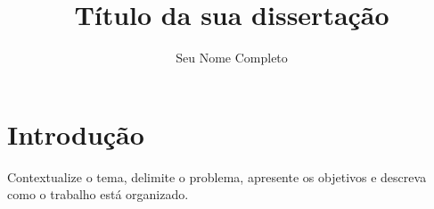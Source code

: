 \documentclass[12pt,a4paper,oneside]{book}
\title{Título da sua dissertação}
\author{Seu Nome Completo}
\begin{document}
\frontmatter

\maketitle

\folhaaprovacao

\makeabstracts


\tableofcontents

\mainmatter


\chapter{Introdução}\label{cap:introducao}

Contextualize o tema, delimite o problema, apresente os objetivos e
descreva como o trabalho está organizado.
\end{document}
